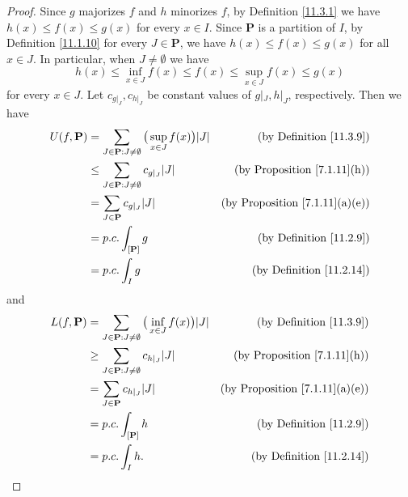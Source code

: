 \begin{proof}
    Since \(g\) majorizes \(f\) and \(h\) minorizes \(f\), by Definition \ref{11.3.1} we have \(h(x) \leq f(x) \leq g(x)\) for every \(x \in I\).
    Since \(\mathbf{P}\) is a partition of \(I\), by Definition \ref{11.1.10} for every \(J \in \mathbf{P}\), we have \(h(x) \leq f(x) \leq g(x)\) for all \(x \in J\).
    In particular, when \(J \neq \emptyset\) we have
    \[
        h(x) \leq \inf_{x \in J} f(x) \leq f(x) \leq \sup_{x \in J} f(x) \leq g(x)
    \]
    for every \(x \in J\).
    Let \(c_{g|_J}, c_{h|_J}\) be constant values of \(g|_J, h|_J\), respectively.
    Then we have
    \begin{align*}
        U(f, \mathbf{P}) & = \sum_{J \in \mathbf{P} : J \neq \emptyset} \big(\sup_{x \in J} f(x)\big) \abs*{J} & \text{(by Definition \ref{11.3.9})}        \\
                         & \leq \sum_{J \in \mathbf{P} : J \neq \emptyset} c_{g|_J} \abs*{J}                   & \text{(by Proposition \ref{7.1.11}(h))}    \\
                         & = \sum_{J \in \mathbf{P}} c_{g|_J} \abs*{J}                                         & \text{(by Proposition \ref{7.1.11}(a)(e))} \\
                         & = p.c. \int_{[\mathbf{P}]} g                                                        & \text{(by Definition \ref{11.2.9})}        \\
                         & = p.c. \int_I g                                                                     & \text{(by Definition \ref{11.2.14})}
    \end{align*}
    and
    \begin{align*}
        L(f, \mathbf{P}) & = \sum_{J \in \mathbf{P} : J \neq \emptyset} \big(\inf_{x \in J} f(x)\big) \abs*{J} & \text{(by Definition \ref{11.3.9})}        \\
                         & \geq \sum_{J \in \mathbf{P} : J \neq \emptyset} c_{h|_J} \abs*{J}                   & \text{(by Proposition \ref{7.1.11}(h))}    \\
                         & = \sum_{J \in \mathbf{P}} c_{h|_J} \abs*{J}                                         & \text{(by Proposition \ref{7.1.11}(a)(e))} \\
                         & = p.c. \int_{[\mathbf{P}]} h                                                        & \text{(by Definition \ref{11.2.9})}        \\
                         & = p.c. \int_I h.                                                                    & \text{(by Definition \ref{11.2.14})}
    \end{align*}
\end{proof}

